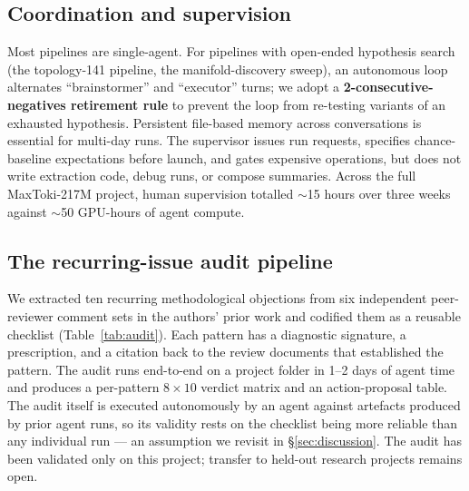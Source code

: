 \documentclass{article}
\newcommand{\maxtoki}{MaxToki-217M\xspace}
\begin{document}
\subsection{Coordination and supervision}
Most pipelines are single-agent. For pipelines with open-ended
hypothesis search (the topology-141 pipeline, the
manifold-discovery sweep), an autonomous loop alternates
``brainstormer'' and ``executor'' turns; we adopt a
\textbf{2-consecutive-negatives retirement rule} to prevent the
loop from re-testing variants of an exhausted hypothesis.
Persistent file-based memory across conversations is essential for
multi-day runs. The supervisor issues run requests, specifies
chance-baseline expectations before launch, and gates expensive
operations, but does not write extraction code, debug runs, or
compose summaries. Across the full \maxtoki{} project, human
supervision totalled $\sim$15 hours over three weeks against
$\sim$50 GPU-hours of agent compute.

\subsection{The recurring-issue audit pipeline}
\label{sec:audit}

We extracted ten recurring methodological objections from six
independent peer-reviewer comment sets in the authors' prior work
and codified them as a reusable checklist (Table~\ref{tab:audit}).
Each pattern has a diagnostic signature, a prescription, and a
citation back to the review documents that established the
pattern. The audit runs end-to-end on a project folder in 1--2
days of agent time and produces a per-pattern $8 \times 10$
verdict matrix and an action-proposal table. The audit itself
is executed autonomously by an agent against artefacts produced by
prior agent runs, so its validity rests on the checklist being
more reliable than any individual run --- an assumption we
revisit in \S\ref{sec:discussion}. The audit has been validated
only on this project; transfer to held-out research projects
remains open.
\end{document}
